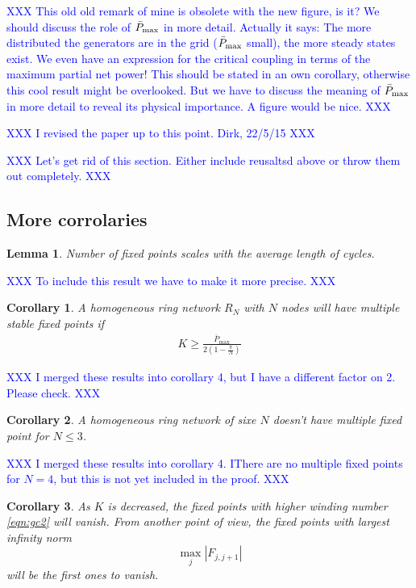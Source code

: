 \documentclass[10pt,aps,pre,preprint,superscriptaddress]{revtex4-1}
\newcommand{\dirk}[1]{\textcolor{blue}{#1}}
\newtheorem{lemma}{Lemma}
\newtheorem{corr}{Corollary}
\begin{document}
\dirk{XXX This old old remark of mine is obsolete with the new figure, is it?
We should discuss the role of $\bar P_{\rm max}$ in more detail. Actually it says:
The more distributed the generators are in the grid ($\bar P_{\rm max}$ small), the more steady 
states exist. We even have an expression for the critical coupling in terms of the maximum
partial net power! This should be stated in an own corollary, otherwise this cool result might 
be overlooked. But we have to discuss the meaning of $\bar P_{\rm max}$ in more detail
to reveal its physical importance. A figure would be nice. XXX}


\dirk{XXX I revised the paper up to this point. Dirk, 22/5/15 XXX}

\dirk{XXX Let's get rid of this section. Either include reusaltsd above or throw them out
completely. XXX}


\subsection{More corrolaries}
\begin{lemma}
\label{}
Number of fixed points scales with the average length of cycles.  
\end{lemma}

\dirk{XXX To include this result we have to make it more precise. XXX}

\begin{corr}
\label{cor:high-k-nf}
A homogeneous ring network $R_{N}$ with $N$ nodes 
 will have multiple stable fixed 
points if 
\begin{align}
\label{crit:mult-fp}
K\geq \frac{\bar{P}_{\max}}{2\left(1-\frac{\pi}{N}\right)}
\end{align}
\end{corr}

\dirk{XXX I merged these results into corollary 4, but I have a different factor on 2. Please check. XXX}

\begin{corr}
\label{corr:nomult-3}
A homogeneous ring network of sixe $N$ doesn't have multiple fixed point for 
$N\leq 3$.  
\end{corr}

\dirk{XXX I merged these results into corollary 4. IThere are no multiple fixed points for $N=4$, 
but this is not yet included in the proof. XXX}


\begin{corr}
As $K$ is decreased, the fixed points with higher \emph{winding number} 
\eqref{eqn:gc2} will vanish. From another point of view, the fixed points with 
largest infinity norm
\[
\max_j\left|F_{j,j+1}\right|
\]
will be the first ones to vanish.  
\end{corr} 
\end{document}
